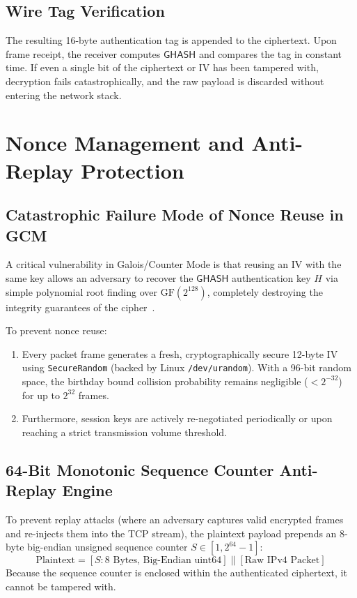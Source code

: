 \subsection{Wire Tag Verification}
The resulting 16-byte authentication tag is appended to the ciphertext. Upon frame receipt, the receiver computes $\mathsf{GHASH}$ and compares the tag in constant time. If even a single bit of the ciphertext or IV has been tampered with, decryption fails catastrophically, and the raw payload is discarded without entering the network stack.

\section{Nonce Management and Anti-Replay Protection}
\label{sec:nonce_replay_protection}

\subsection{Catastrophic Failure Mode of Nonce Reuse in GCM}
A critical vulnerability in Galois/Counter Mode is that reusing an IV with the same key allows an adversary to recover the $\mathsf{GHASH}$ authentication key $H$ via simple polynomial root finding over $\text{GF}(2^{128})$, completely destroying the integrity guarantees of the cipher~\cite{ferguson2010cryptography}.

To prevent nonce reuse:
\begin{enumerate}
    \item Every packet frame generates a fresh, cryptographically secure 12-byte IV using \texttt{SecureRandom} (backed by Linux \texttt{/dev/urandom}). With a 96-bit random space, the birthday bound collision probability remains negligible ($< 2^{-32}$) for up to $2^{32}$ frames.
    \item Furthermore, session keys are actively re-negotiated periodically or upon reaching a strict transmission volume threshold.
\end{enumerate}

\subsection{64-Bit Monotonic Sequence Counter Anti-Replay Engine}
To prevent replay attacks (where an adversary captures valid encrypted frames and re-injects them into the TCP stream), the plaintext payload prepends an 8-byte big-endian unsigned sequence counter $S \in [1, 2^{64}-1]$:
\begin{equation}
\text{Plaintext} = [S : 8\text{ Bytes, Big-Endian uint64}] \parallel [\text{Raw IPv4 Packet}]
\end{equation}
Because the sequence counter is enclosed within the authenticated ciphertext, it cannot be tampered with.

